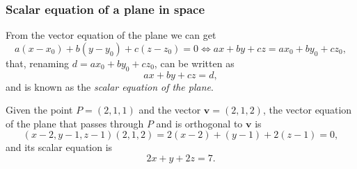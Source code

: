 \begin{frame}
\frametitle{Scalar equation of a plane in space}
From the vector equation of the plane we can get
\[
a(x-x_0)+b(y-y_0)+c(z-z_0) = 0 \Leftrightarrow ax+by+cz=ax_0+by_0+cz_0,
\]
that, renaming $d=ax_0+by_0+cz_0$, can be written as
\[
ax+by+cz=d,
\]
and is known as the \emph{scalar equation of the plane}.

 Given the point $P=(2,1,1)$ and the vector $\mathbf{v}=(2,1,2)$, the vector equation of the plane that passes through $P$ and is orthogonal to $\mathbf{v}$ is
\[
(x-2,y-1,z-1)(2,1,2)=2(x-2)+(y-1)+2(z-1)=0,
\]
and its scalar equation is 
\[
2x+y+2z=7.
\] 
\end{frame}



